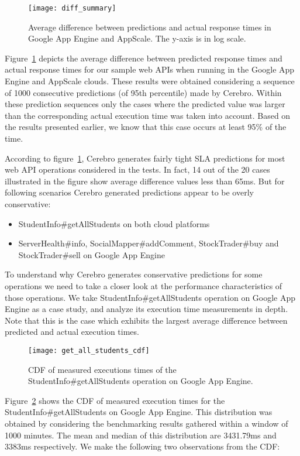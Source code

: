 \begin{figure}
\centering
\texttt{[image: diff\_summary]}
\caption{Average difference between predictions and actual response times in Google App Engine and AppScale. The y-axis is in log scale.}
\label{fig:diff_summary}
\end{figure}

Figure~\ref{fig:diff_summary} depicts the average difference between predicted response times and actual response times for
our sample web APIs when running in the Google App Engine and AppScale clouds. 
These results were obtained considering a sequence of 1000 consecutive predictions (of 95th percentile) made by Cerebro. 
Within these prediction sequences only the cases 
where the predicted value was larger than the corresponding actual execution time was taken into account. Based on the results
presented earlier, we know that this case occurs at least 95\% of the time.

According to figure~\ref{fig:diff_summary}, Cerebro generates fairly tight SLA predictions for most web API operations considered in the tests. In fact,
14 out of the 20 cases illustrated in the figure show average difference values less than 65ms. But for following scenarios Cerebro generated
predictions appear to be overly conservative:

\begin{itemize}
\item StudentInfo\#getAllStudents on both cloud platforms
\item ServerHealth\#info, SocialMapper\#addComment, StockTrader\#buy and StockTrader\#sell on Google App Engine
\end{itemize}

To understand why Cerebro generates conservative predictions for some operations we need to 
take a closer look at the performance characteristics of those operations. We take StudentInfo\#getAllStudents
operation on Google App Engine as a case study, and analyze its execution time measurements in depth. 
Note that this is the case which exhibits the largest average difference between predicted and actual execution times.

\begin{figure}
\centering
\texttt{[image: get\_all\_students\_cdf]}
\caption{CDF of measured executions times of the StudentInfo\#getAllStudents operation on Google App Engine.}
\label{fig:get_all_students_cdf}
\end{figure}

Figure~\ref{fig:get_all_students_cdf} shows the CDF of measured execution times for the StudentInfo\#getAllStudents on Google
App Engine. This distribution was obtained by considering the benchmarking results gathered within a window of 1000 minutes. 
The mean and median of this distribution are 3431.79ms and 3383ms respectively. We make the following two observations from the
CDF:

